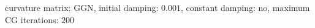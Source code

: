 curvature matrix: $\text{GGN}$, initial damping: $\num[scientific-notation=true]{0.001}$, constant damping: $\text{no}$, maximum CG iterations: $\num[scientific-notation=false]{200}$